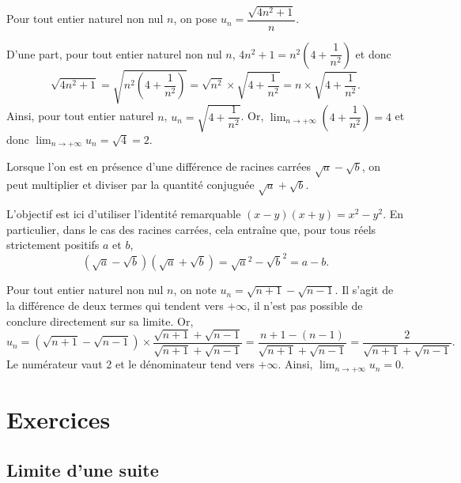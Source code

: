 \documentclass[11pt,fleqn]{book} %
\begin{document}
\begin{example}Pour tout entier naturel non nul $n$, on pose $u_n = \dfrac{\sqrt{4n^2+1}}{n}$.

D'une part, pour tout entier naturel non nul $n$, $4n^2+1=n^2\left(4+\dfrac{1}{n^2}\right)$ et donc 
\[\sqrt{4n^2+1}=\sqrt{n^2\left(4+\dfrac{1}{n^2}\right)}=\sqrt{n^2}\times \sqrt{4+\dfrac{1}{n^2}}=n \times  \sqrt{4+\dfrac{1}{n^2}}.\]
Ainsi, pour tout entier naturel $n$, $u_n=\sqrt{4+\dfrac{1}{n^2}}$. Or, $\displaystyle\lim_{n\to + \infty}\left(4+\dfrac{1}{n^2}\right)=4$ et donc $\displaystyle\lim_{n\to + \infty} u_n = \sqrt{4}=2$.\end{example}

Lorsque l'on est en présence d'une différence de racines carrées $\sqrt{a}-\sqrt{b}$, on peut multiplier et diviser par la quantité conjuguée $\sqrt{a}+\sqrt{b}$.

L'objectif est ici d'utiliser l'identité remarquable $(x-y)(x+y)=x^2-y^2$. En particulier, dans le cas des racines carrées, cela entraîne que, pour tous réels strictement positifs $a$ et $b$,\[(\sqrt{a}-\sqrt{b})(\sqrt{a}+\sqrt{b})=\sqrt{a}^2-\sqrt{b}^2=a-b.\]

\begin{example} Pour tout entier naturel non nul $n$, on note $u_n=\sqrt{n+1}-\sqrt{n-1}$. Il s'agit de la différence de deux termes qui tendent vers $+\infty$, il n'est pas possible de conclure directement sur sa limite. Or,
\[ u_n = (\sqrt{n+1}-\sqrt{n-1}) \times \dfrac{\sqrt{n+1}+\sqrt{n-1}}{\sqrt{n+1}+\sqrt{n-1}}=\dfrac{n+1-(n-1)}{\sqrt{n+1}+\sqrt{n-1}}=\dfrac{2}{\sqrt{n+1}+\sqrt{n-1}}.\]
Le numérateur vaut 2 et le dénominateur tend vers $+\infty$. Ainsi, $\displaystyle \lim_{n \to +\infty} u_n = 0$.
\end{example}

\newpage


\chapter{Exercices}
\setcounter{section}{0}

\section*{Limite d'une suite}
\end{document}
